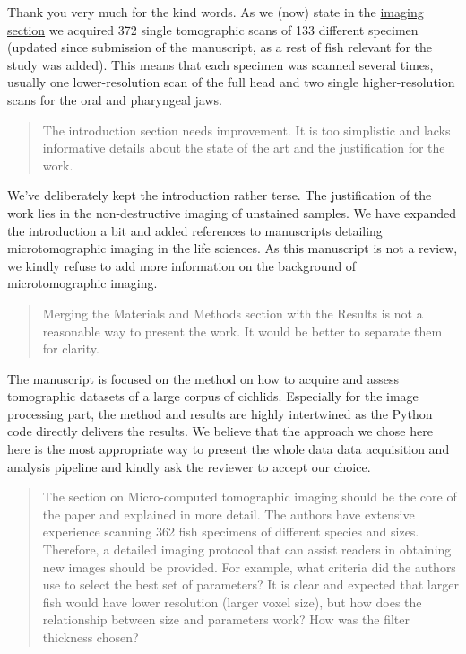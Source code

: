 \documentclass[color,english,personal]{ubletter}
\begin{document}
\begin{letter}{}
Thank you very much for the kind words. As we (now) state in the
\href{https://habi.github.io/EAWAG-manuscript/\#micro-computed-tomographic-imaging}{imaging
section} we acquired 372 single tomographic scans of 133 different
specimen (updated since submission of the manuscript, as a rest of fish
relevant for the study was added). This means that each specimen was
scanned several times, usually one lower-resolution scan of the full
head and two single higher-resolution scans for the oral and pharyngeal
jaws.

\begin{quote}
The introduction section needs improvement. It is too simplistic and
lacks informative details about the state of the art and the
justification for the work.
\end{quote}

We've deliberately kept the introduction rather terse. The justification
of the work lies in the non-destructive imaging of unstained samples. We
have expanded the introduction a bit and added references to manuscripts
detailing microtomographic imaging in the life sciences. As this
manuscript is not a review, we kindly refuse to add more information on
the background of microtomographic imaging.

\begin{quote}
Merging the Materials and Methods section with the Results is not a
reasonable way to present the work. It would be better to separate them
for clarity.
\end{quote}

The manuscript is focused on the method on how to acquire and assess
tomographic datasets of a large corpus of cichlids. Especially for the
image processing part, the method and results are highly intertwined as
the Python code directly delivers the results. We believe that the
approach we chose here here is the most appropriate way to present the
whole data data acquisition and analysis pipeline and kindly ask the
reviewer to accept our choice.

\begin{quote}
The section on Micro-computed tomographic imaging should be the core of
the paper and explained in more detail. The authors have extensive
experience scanning 362 fish specimens of different species and sizes.
Therefore, a detailed imaging protocol that can assist readers in
obtaining new images should be provided. For example, what criteria did
the authors use to select the best set of parameters? It is clear and
expected that larger fish would have lower resolution (larger voxel
size), but how does the relationship between size and parameters work?
How was the filter thickness chosen?
\end{quote}


\end{letter}
\end{document}
